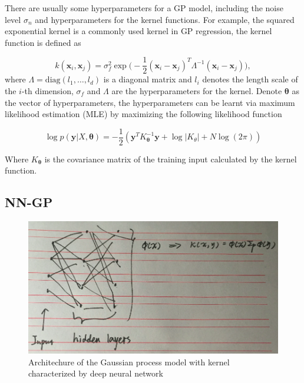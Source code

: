 There are usually some hyperparameters for a GP model, including the noise level $\sigma_n$ and hyperparameters for the kernel functions. For example, the squared exponential kernel is a commonly used kernel in GP regression, the kernel function is defined as

\begin{equation}
    \label{eq:GaussianCovarianceFunction}
    k(\bm{x}_i, \bm{x}_j) = \sigma_f^2 \exp\Big(-\frac{1}{2}(\bm{x}_i - \bm{x}_j)^T\Lambda^{-1}(\bm{x}_i - \bm{x}_j)\Big),
\end{equation}
where $\Lambda = \mathrm{diag}(l_1, \dots, l_d)$ is a diagonal matrix and $l_i$ denotes the length scale of the $i$-th dimension, $\sigma_f$ and $\Lambda$ are the hyperparameters for the kernel. Denote $\bm{\theta}$ as the vector of hyperparameters, the hyperparameters can be learnt via maximum likelihood estimation (MLE) by maximizing the following likelihood function

\begin{equation}
    \log p(\bm{y} | X, \bm{\theta}) = -\frac{1}{2}(\bm{y}^T K_{\bm{\theta}}^{-1} \bm{y} + \log |K_{\theta}| + N \log(2 \pi))
\end{equation}

Where $K_{\bm{\theta}}$ is the covariance matrix of the training input calculated by the kernel function.

\subsection{NN-GP}

\begin{figure}[!htb]
    \centering
    \includegraphics[width=\columnwidth]{./img/NN-GP.png}
    \caption{Architechure of the Gaussian process model with kernel characterized by deep neural network}
\end{figure}

